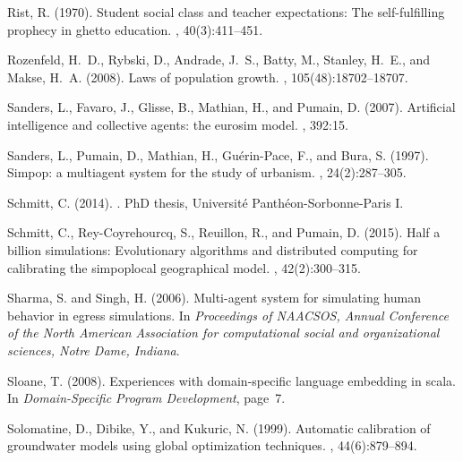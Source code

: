 \documentclass[10pt]{article}
\begin{document}
\begin{thebibliography}{}
Rist, R. (1970).
\newblock Student social class and teacher expectations: The self-fulfilling
  prophecy in ghetto education.
, 40(3):411--451.

Rozenfeld, H.~D., Rybski, D., Andrade, J.~S., Batty, M., Stanley, H.~E., and
  Makse, H.~A. (2008).
\newblock Laws of population growth.
,
  105(48):18702--18707.

Sanders, L., Favaro, J., Glisse, B., Mathian, H., and Pumain, D. (2007).
\newblock Artificial intelligence and collective agents: the eurosim model.
, 392:15.

Sanders, L., Pumain, D., Mathian, H., Gu{\'e}rin-Pace, F., and Bura, S. (1997).
\newblock Simpop: a multiagent system for the study of urbanism.
,
  24(2):287--305.

Schmitt, C. (2014).
.
\newblock PhD thesis, Universit{\'e} Panth{\'e}on-Sorbonne-Paris I.

Schmitt, C., Rey-Coyrehourcq, S., Reuillon, R., and Pumain, D. (2015).
\newblock Half a billion simulations: Evolutionary algorithms and distributed
  computing for calibrating the simpoplocal geographical model.
,
  42(2):300--315.

Sharma, S. and Singh, H. (2006).
\newblock Multi-agent system for simulating human behavior in egress
  simulations.
\newblock In {\em Proceedings of NAACSOS, Annual Conference of the North
  American Association for computational social and organizational sciences,
  Notre Dame, Indiana}.

Sloane, T. (2008).
\newblock Experiences with domain-specific language embedding in scala.
\newblock In {\em Domain-Specific Program Development}, page~7.

Solomatine, D., Dibike, Y., and Kukuric, N. (1999).
\newblock Automatic calibration of groundwater models using global optimization
  techniques.
, 44(6):879--894.


\end{thebibliography}
\end{document}
